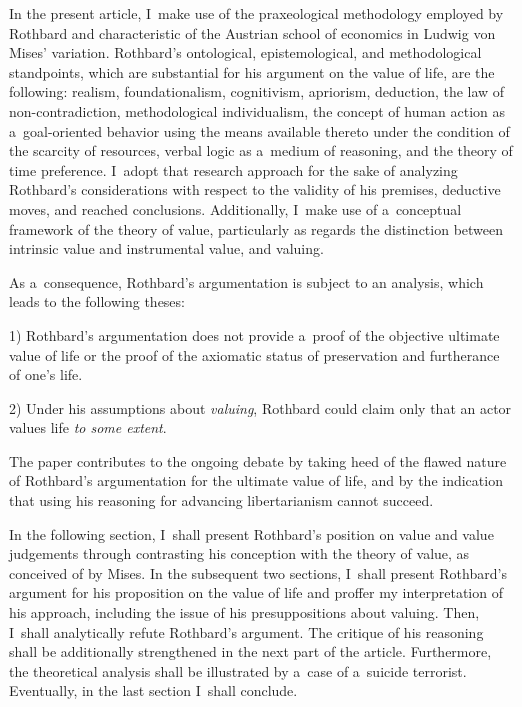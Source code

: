 In the present article, I~make use of the praxeological methodology employed by Rothbard and characteristic of the Austrian school of economics in Ludwig von Mises' variation. Rothbard's ontological, epistemological, and methodological standpoints, which are substantial for his argument on the value of life, are the following: realism, foundationalism, cognitivism, apriorism, deduction, the law of non-contradiction, methodological individualism, the concept of human action as a~goal-oriented behavior using the means available thereto under the condition of the scarcity of resources, verbal logic as a~medium of reasoning, and the theory of time preference. I~adopt that research approach for the sake of analyzing Rothbard's considerations with respect to the validity of his premises, deductive moves, and reached conclusions. Additionally, I~make use of a~conceptual framework of the theory of value, particularly as regards the distinction between intrinsic value and instrumental value, and valuing.



As a~consequence, Rothbard's argumentation is subject to an analysis, which leads to the following theses:



1) Rothbard's argumentation does not provide a~proof of the objective ultimate value of life or the proof of the axiomatic status of preservation and furtherance of one's life.



2) Under his assumptions about \textit{valuing}, Rothbard could claim only that an actor values life \textit{to some extent}.



The paper contributes to the ongoing debate by taking heed of the flawed nature of Rothbard's argumentation for the ultimate value of life, and by the indication that using his reasoning for advancing libertarianism cannot succeed.



In the following section, I~shall present Rothbard's position on value and value judgements through contrasting his conception with the theory of value, as conceived of by Mises. In the subsequent two sections, I~shall present Rothbard's argument for his proposition on the value of life and proffer my interpretation of his approach, including the issue of his presuppositions about valuing. Then, I~shall analytically refute Rothbard's argument. The critique of his reasoning shall be additionally strengthened in the next part of the article. Furthermore, the theoretical analysis shall be illustrated by a~case of a~suicide terrorist. Eventually, in the last section I~shall conclude.




